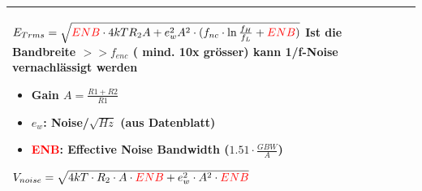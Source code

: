 \begin{longtable}[t]{|p{4cm}|p{13.7cm}|}
{\begin{itemize}[leftmargin=*]
           \newline
        \end{itemize}
       $E_{Trms}=\sqrt{\textcolor{red}{ENB} \cdot 4kTR_2 A+e_w^2 A^2\cdot (f_{nc}\cdot \ln{\frac{f_{H}}{f_{L}}}+\textcolor{red}{ENB})}$\newline
       Ist die Bandbreite $>>f_{enc}$ ( mind. 10x grösser) kann 1/f-Noise vernachlässigt werden\newline
       \vspace{-1.5\topsep}
       \begin{itemize}[leftmargin=*]
           \item Gain $A=\frac{R1+R2}{R1}$
           \item $e_w$: Noise/$\sqrt{Hz}$ (aus Datenblatt)
           \item \textcolor{red}{ENB}: Effective Noise Bandwidth ($1.51 \cdot \frac{GBW}{A}$)
           \newline
        \end{itemize}
        $V_{noise}=\sqrt{4kT \cdot R_{2} \cdot A \cdot \textcolor{red}{ENB}+e_{w}^2 \cdot A^2 \cdot \textcolor{red}{ENB}}$
    }
    \\ \hline
\end{longtable}
